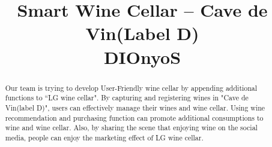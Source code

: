 \documentclass[conference]{IEEEtran}
\numberwithin{figure}{subsection}
\begin{document}
\title{Smart Wine Cellar – Cave de Vin(Label D)\\ \LARGE DIOnyoS}

\author{
\and
{}
\and
{}
\and
{}
}

\maketitle
\thispagestyle{empty}
\pagestyle{empty}
\begin{abstract}
Our team is trying to develop User-Friendly wine cellar by appending additional functions to “LG wine cellar". By capturing and registering wines in "Cave de Vin(label D)", users can effectively manage their wines and wine cellar. Using wine recommendation and purchasing function can promote additional consumptions to wine and wine cellar. Also, by sharing the scene that enjoying wine on the social media, people can enjoy the marketing effect of LG wine cellar.
\end{abstract}
\end{document}
